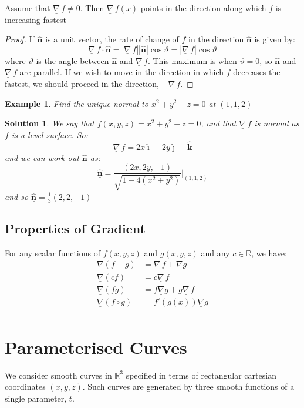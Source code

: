\documentclass{article}
\newcommand{\R}{\mathbb{R}}
\newcommand{\veci}{\bm{\hat{\imath}}}
\newcommand{\vecj}{\bm{\hat{\jmath}}}
\newcommand{\veck}{\bm{\hat{k}}}
\newcommand{\vecn}{\underline{\mathbf{\hat{n}}}}
\renewcommand{\th}{\vartheta}
\newcommand{\nab}{\underline{\nabla}}
\newcommand{\grad}{{\nab}\, f}
\newtheorem{example}{Example}
\newtheorem{solution}{Solution}
\begin{document}
\noindent\begin{theorem}{}{}
   Assume that $\displaystyle{\grad \neq 0}$. Then $\grad(x)$ points in the direction along which $f$ is increasing fastest
\end{theorem}\vspace{10pt}
\begin{proof}
  If $\vecn$ is a unit vector, the rate of change of $f$ in the direction $\vecn$ is given by:
  $$ \grad \cdot \vecn = |\grad||\vecn|\cos{\vartheta} = |\grad|\cos{\vartheta} $$
  where $\vartheta$ is the angle between $\vecn$ and $\grad$. This maximum is when $\th = 0$, so $\vecn$ and $\grad$ are parallel. If we wish to move in the direction in which $f$ decreases the fastest, we should proceed in the direction, $-\grad$.
\end{proof}

\begin{example}{
   Find the unique normal to $\displaystyle{x^2 + y^2 - z = 0}$ at $(1, 1, 2)$
}\end{example}\begin{solution}{
  We say that $f(x, y, z) = x^2 + y^2 - z = 0$, and that $\grad$ is normal as $f$ is a level surface. So:
  $$ \grad = 2x\veci + 2y\vecj - \veck$$
  and we can work out $\vecn$ as:
  $$ \vecn = \frac{(2x, 2y, -1)}{\sqrt{1 + 4(x^2 + y^2)}}\Bigr|_{(1, 1, 2)} $$
  and so $\vecn = \frac{1}{3}(2, 2, -1)$
}\end{solution}\vspace{10pt}

\subsection{Properties of Gradient}
For any scalar functions of $f(x, y, z)$ and $g(x, y, z)$ and any $c\in\R$, we have:
\begin{align*}
  \nab{(f + g)} &= \grad + \nab g\\
  \nab{(cf)} &= c\grad \\
  \nab{(fg)} &= f\nab{g} + g\grad\\
  \nab{(f\circ g)} &= f'(g(x))\nab{g}\\
\end{align*}

\section{Parameterised Curves}
We consider smooth curves in $\R^3$ specified in terms of rectangular cartesian coordinates $(x, y, z)$. Such curves are generated by three smooth functions of a single parameter, $t$.
\end{document}
